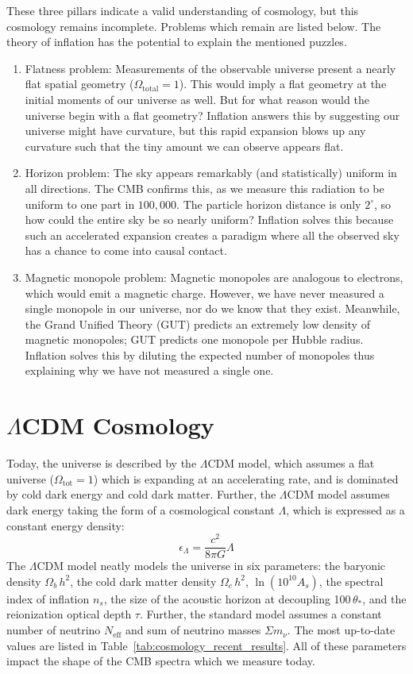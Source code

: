 These three pillars indicate a valid understanding of cosmology, but this cosmology remains incomplete.  Problems which remain are listed below.
The theory of inflation has the potential to explain the mentioned puzzles.

\begin{enumerate}
    \item Flatness problem:  Measurements of the observable universe present a nearly flat spatial geometry ($\Omega_{\text{total}}=1$).  This would imply a flat geometry at the initial moments of our universe as well.  But for what reason would the universe begin with a flat geometry?  Inflation answers this by suggesting our universe might have curvature, but this rapid expansion blows up any curvature such that the tiny amount we can observe appears flat. 
    \item Horizon problem:  The sky appears remarkably (and statistically) uniform in all directions.  The CMB confirms this, as we measure this radiation to be uniform to one part in $100,000$.  The particle horizon distance is only $2^{\circ}$, so how could the entire sky be so nearly uniform?  Inflation solves this because such an accelerated expansion creates a paradigm where all the observed sky has a chance to come into causal contact.
    \item Magnetic monopole problem:  Magnetic monopoles are analogous to electrons, which would emit a magnetic charge.  However, we have never measured a single monopole in our universe, nor do we know that they exist.  Meanwhile, the Grand Unified Theory (GUT) predicts an extremely low density of magnetic monopoles; GUT predicts one monopole per Hubble radius.  Inflation solves this by diluting the expected number of monopoles thus explaining why we have not measured a single one.
\end{enumerate}
\section{$\Lambda$CDM Cosmology}
Today, the universe is described by the $\Lambda$CDM model, which assumes a flat universe ($\Omega_{\text{tot}}=1$) which is expanding at an accelerating rate, and is dominated by cold dark energy and cold dark matter.  Further, the $\Lambda$CDM model assumes dark energy taking the form of a cosmological constant $\Lambda$, which is expressed as a constant energy density:
\begin{equation}
    \epsilon_\Lambda = \frac{c^2}{8\pi G}\Lambda 
\end{equation}
The $\Lambda$CDM model neatly models the universe in six parameters: the baryonic density $\Omega_b\,h^2$, the cold dark matter density $\Omega_c\,h^2$, $\ln(10^{10}A_s)$, the spectral index of inflation $n_s$, the size of the acoustic horizon at decoupling 100\,$\theta_{*}$, and the reionization optical depth $\tau$.  Further, the standard model assumes a constant number of neutrino $N_{\text{eff}}$ and sum of neutrino masses $\Sigma m_\nu$. The most up-to-date values are listed in Table~\ref{tab:cosmology_recent_results}.  All of these parameters impact the shape of the CMB spectra which we measure today.

